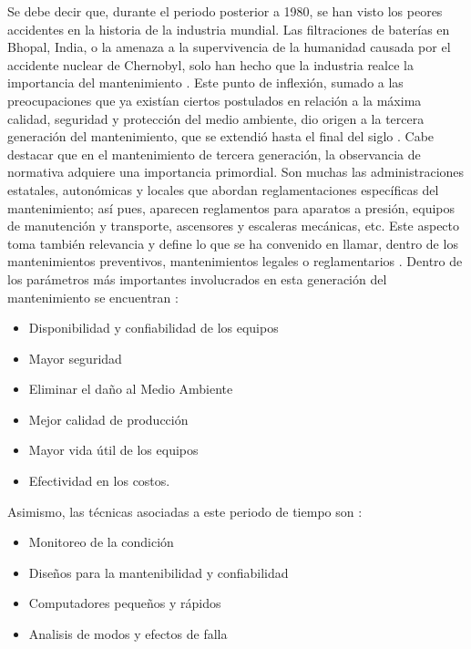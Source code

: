 Se debe decir que, durante el periodo posterior a 1980, se han visto los peores accidentes en la historia de la industria mundial. Las filtraciones de baterías en Bhopal, India, o  la amenaza a la supervivencia de la humanidad causada por el accidente nuclear de Chernobyl, solo han hecho que la industria realce la importancia del mantenimiento \citep{shenoy2005}. Este punto de inflexión, sumado a las preocupaciones que ya existían ciertos postulados en relación a la máxima calidad, seguridad y protección del medio ambiente, dio origen a la tercera generación del mantenimiento, que se extendió hasta el final del siglo \citep{garcia2012}. Cabe destacar que en el mantenimiento de tercera generación, la observancia de normativa adquiere una importancia primordial. Son muchas las administraciones estatales, autonómicas y locales que abordan reglamentaciones específicas del mantenimiento; así pues, aparecen reglamentos para aparatos a presión, equipos de manutención y transporte, ascensores y escaleras mecánicas, etc. Este aspecto toma también relevancia y define lo que se ha convenido en llamar, dentro de los mantenimientos preventivos, mantenimientos legales o reglamentarios \citep{gonzalez2005}. Dentro de los parámetros más importantes involucrados en esta generación del mantenimiento se encuentran \citep{louis2012}:

\begin{itemize}
\item Disponibilidad y confiabilidad de los equipos
\item Mayor seguridad
\item Eliminar el daño al Medio Ambiente
\item Mejor calidad de producción
\item Mayor vida útil de los equipos
\item Efectividad en los costos.
\end{itemize}

Asimismo, las técnicas asociadas a este periodo de tiempo son \citep{louis2012}:\\

\begin{itemize}
\item Monitoreo de la condición
\item Diseños para la mantenibilidad y confiabilidad
\item Computadores pequeños y rápidos
\item Analisis de modos y efectos de falla
\end{itemize}     

